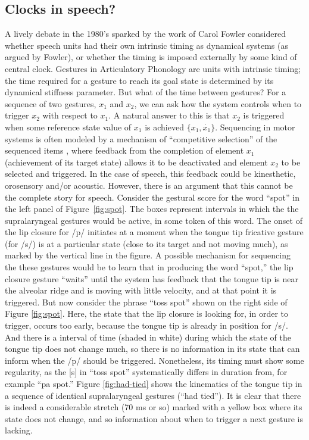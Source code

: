 \documentclass[output=paper,
modfonts
]{LSP/langsci}
\begin{document}
\subsection{Clocks in speech?}
A lively debate in the 1980's sparked by the work of Carol Fowler \citep{Fowler80} considered whether speech units had their own intrinsic timing as dynamical systems (as argued by Fowler), or whether the timing is imposed externally by some kind of central clock. Gestures in Articulatory Phonology are units with intrinsic timing; the time required for a gesture to reach its goal state is determined by its dynamical stiffness parameter. But what of the time between gestures? For a sequence of two gestures, $x{_1}$ and $x{_2}$, we can ask how the system controls when to trigger $x{_2}$ with respect to $x{_1}$. A natural answer to this is that $x{_2}$ is triggered when some reference state value of $x{_1}$ is achieved $\{x{_1}, \dot{x{_1}}\}$. Sequencing in motor systems is often modeled by a mechanism of ``competitive selection'' of the sequenced items \citep{Bullock2002,Grossberg78}, where feedback from the completion of element $x{_1}$ (achievement of its target state) allows it to be deactivated and element $x{_2}$ to be selected and triggered.  In the case of speech, this feedback could be kinesthetic, orosensory and/or acoustic. However, there is an argument that this cannot be the complete story for speech. Consider the gestural score for the word ``spot'' in the left panel of Figure~\ref{fig:spot}. The boxes represent intervals in which the the supralaryngeal gestures would be active, in some token of this word. The onset of the lip closure for /p/ initiates at a moment when the tongue tip fricative gesture (for /s/) is at a particular state (close to its target and not moving much), as marked by the vertical line in the figure. A possible mechanism for sequencing the these gestures would be to learn that in producing the word ``spot,'' the lip closure gesture ``waits'' until the system has feedback that the tongue tip is near the alveolar ridge and is moving with little velocity, and at that point it is triggered.   But now consider the phrase ``toss spot'' shown on the right side of Figure \ref{fig:spot}. Here, the state that the lip closure is looking for, in order to trigger, occurs too early, because the tongue tip is already in position for /s/. And there is a interval of time (shaded in white) during which the state of the tongue tip does not change much, so there is no information in its state that can inform when the /p/ should be triggered. Nonetheless, its timing must show some regularity, as the [s] in ``toss spot'' systematically differs in duration from, for example ``pa spot.'' Figure \ref{fig:had-tied} shows the kinematics of the tongue tip in a sequence of identical supralaryngeal gestures (``had tied'').  It is clear that there is indeed a considerable stretch (70 ms or so) marked with a yellow box  where its state does not change, and so information about when to trigger a next gesture is lacking. 
\end{document}
